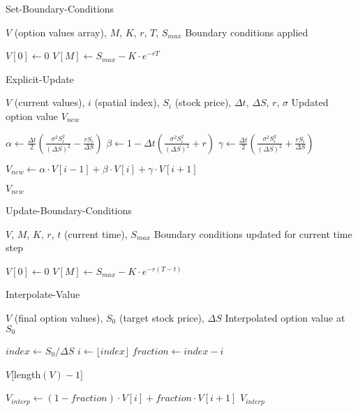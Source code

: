 \documentclass[12pt,a4paper]{article}
\numberwithin{algorithm}{subsection}
\begin{document}
\begin{algorithm}[H]
\caption{Set-Boundary-Conditions}
\begin{algorithmic}[1]
\REQUIRE $V$ (option values array), $M$, $K$, $r$, $T$, $S_{max}$
\ENSURE Boundary conditions applied

\STATE $V[0] \leftarrow 0$ 
\STATE $V[M] \leftarrow S_{max} - K \cdot e^{-rT}$ 
\end{algorithmic}
\end{algorithm}

\begin{algorithm}[H]
\caption{Explicit-Update}
\begin{algorithmic}[1]
\REQUIRE $V$ (current values), $i$ (spatial index), $S_i$ (stock price), $\Delta t$, $\Delta S$, $r$, $\sigma$
\ENSURE Updated option value $V_{new}$

\STATE $\alpha \leftarrow \frac{\Delta t}{2} \left( \frac{\sigma^2 S_i^2}{(\Delta S)^2} - \frac{rS_i}{\Delta S} \right)$
\STATE $\beta \leftarrow 1 - \Delta t \left( \frac{\sigma^2 S_i^2}{(\Delta S)^2} + r \right)$
\STATE $\gamma \leftarrow \frac{\Delta t}{2} \left( \frac{\sigma^2 S_i^2}{(\Delta S)^2} + \frac{rS_i}{\Delta S} \right)$

\STATE $V_{new} \leftarrow \alpha \cdot V[i-1] + \beta \cdot V[i] + \gamma \cdot V[i+1]$

\RETURN $V_{new}$
\end{algorithmic}
\end{algorithm}

\begin{algorithm}[H]
\caption{Update-Boundary-Conditions}
\begin{algorithmic}[1]
\REQUIRE $V$, $M$, $K$, $r$, $t$ (current time), $S_{max}$
\ENSURE Boundary conditions updated for current time step

\STATE $V[0] \leftarrow 0$ 
\STATE $V[M] \leftarrow S_{max} - K \cdot e^{-r(T-t)}$ 
\end{algorithmic}
\end{algorithm}

\begin{algorithm}[H]
\caption{Interpolate-Value}
\begin{algorithmic}[1]
\REQUIRE $V$ (final option values), $S_0$ (target stock price), $\Delta S$
\ENSURE Interpolated option value at $S_0$

\STATE $index \leftarrow S_0 / \Delta S$
\STATE $i \leftarrow \lfloor index \rfloor$
\STATE $fraction \leftarrow index - i$

    \RETURN $V[$length$(V) - 1]$ 
\ENDIF

\STATE $V_{interp} \leftarrow (1 - fraction) \cdot V[i] + fraction \cdot V[i+1]$
\RETURN $V_{interp}$
\end{algorithmic}
\end{algorithm}
\end{document}
